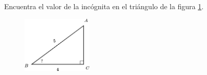 Encuentra el valor de la incógnita en el triángulo de la figura \ref{fig:angle_functrig_14}.
\begin{figure}[H]
    \begin{center}
        \includegraphics[width=0.3\textwidth]{../images/angle_functrig_14.png}
    \end{center}
    \caption{}
    \label{fig:angle_functrig_14}
\end{figure}
